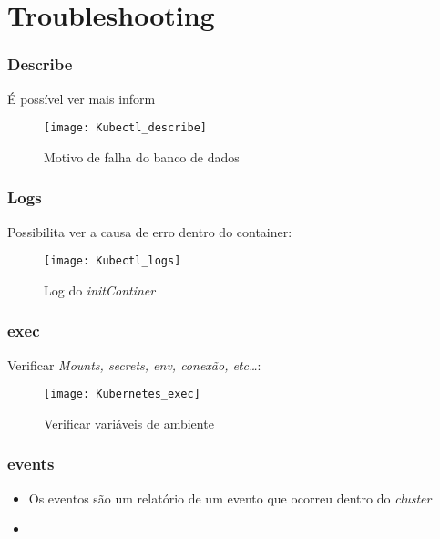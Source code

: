 \section{Troubleshooting}

\begin{frame}
\frametitle{Describe}
É possível ver mais inform
\begin{figure}[htpb]
	\centering
	\texttt{[image: Kubectl\_describe]}
	\caption{Motivo de falha do banco de dados}
\end{figure}
\end{frame}

\begin{frame}
\frametitle{Logs}
Possibilita ver a causa de erro dentro do container:
\begin{figure}[htpb]
	\centering
	\texttt{[image: Kubectl\_logs]}
	\caption{Log do \textit{initContiner}}
\end{figure}
\end{frame}

\begin{frame}
\frametitle{exec}
Verificar \textit{Mounts, secrets, env, conexão, etc\dots}:
\begin{figure}[htpb]
	\centering
	\texttt{[image: Kubernetes\_exec]}
	\caption{Verificar variáveis de ambiente}
\end{figure}
\end{frame}

\begin{frame}
\frametitle{events}
\begin{itemize}
	\item Os eventos são um relatório de um evento que ocorreu dentro do \textit{cluster}
	\item {}
\end{itemize}

\end{frame}
